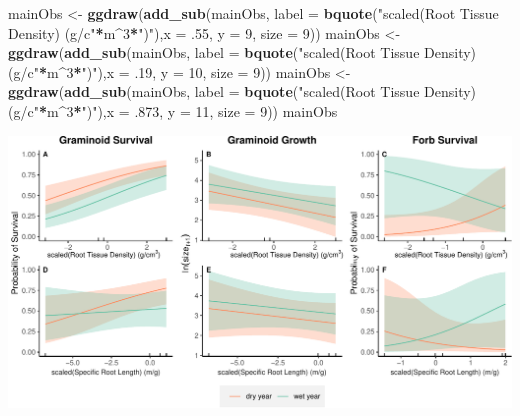\documentclass[
]{article}
\newenvironment{Shaded}{\begin{snugshade}}{\end{snugshade}}
\newcommand{\DataTypeTok}[1]{\textcolor[rgb]{0.13,0.29,0.53}{#1}}
\newcommand{\DecValTok}[1]{\textcolor[rgb]{0.00,0.00,0.81}{#1}}
\newcommand{\FloatTok}[1]{\textcolor[rgb]{0.00,0.00,0.81}{#1}}
\newcommand{\KeywordTok}[1]{\textcolor[rgb]{0.13,0.29,0.53}{\textbf{#1}}}
\newcommand{\NormalTok}[1]{#1}
\newcommand{\OperatorTok}[1]{\textcolor[rgb]{0.81,0.36,0.00}{\textbf{#1}}}
\newcommand{\StringTok}[1]{\textcolor[rgb]{0.31,0.60,0.02}{#1}}
\begin{document}
\begin{Shaded}
\begin{Highlighting}[]
\NormalTok{mainObs \textless{}{-}}\StringTok{ }\KeywordTok{ggdraw}\NormalTok{(}\KeywordTok{add\_sub}\NormalTok{(mainObs, }\DataTypeTok{label =} \KeywordTok{bquote}\NormalTok{(}\StringTok{"scaled(Root Tissue Density) (g/c"}\OperatorTok{*}\NormalTok{m}\OperatorTok{\^{}}\DecValTok{3}\OperatorTok{*}\StringTok{")"}\NormalTok{),}\DataTypeTok{x =} \FloatTok{.55}\NormalTok{, }\DataTypeTok{y =} \DecValTok{9}\NormalTok{, }\DataTypeTok{size =} \DecValTok{9}\NormalTok{))}
\NormalTok{mainObs \textless{}{-}}\StringTok{ }\KeywordTok{ggdraw}\NormalTok{(}\KeywordTok{add\_sub}\NormalTok{(mainObs, }\DataTypeTok{label =} \KeywordTok{bquote}\NormalTok{(}\StringTok{"scaled(Root Tissue Density) (g/c"}\OperatorTok{*}\NormalTok{m}\OperatorTok{\^{}}\DecValTok{3}\OperatorTok{*}\StringTok{")"}\NormalTok{),}\DataTypeTok{x =} \FloatTok{.19}\NormalTok{, }\DataTypeTok{y =} \DecValTok{10}\NormalTok{, }\DataTypeTok{size =} \DecValTok{9}\NormalTok{))}
\NormalTok{mainObs \textless{}{-}}\StringTok{ }\KeywordTok{ggdraw}\NormalTok{(}\KeywordTok{add\_sub}\NormalTok{(mainObs, }\DataTypeTok{label =} \KeywordTok{bquote}\NormalTok{(}\StringTok{"scaled(Root Tissue Density) (g/c"}\OperatorTok{*}\NormalTok{m}\OperatorTok{\^{}}\DecValTok{3}\OperatorTok{*}\StringTok{")"}\NormalTok{),}\DataTypeTok{x =} \FloatTok{.873}\NormalTok{, }\DataTypeTok{y =} \DecValTok{11}\NormalTok{, }\DataTypeTok{size =} \DecValTok{9}\NormalTok{))}
\NormalTok{mainObs}
\end{Highlighting}
\end{Shaded}

\includegraphics{figures/suppObservationsFig-1.pdf}
\end{document}
